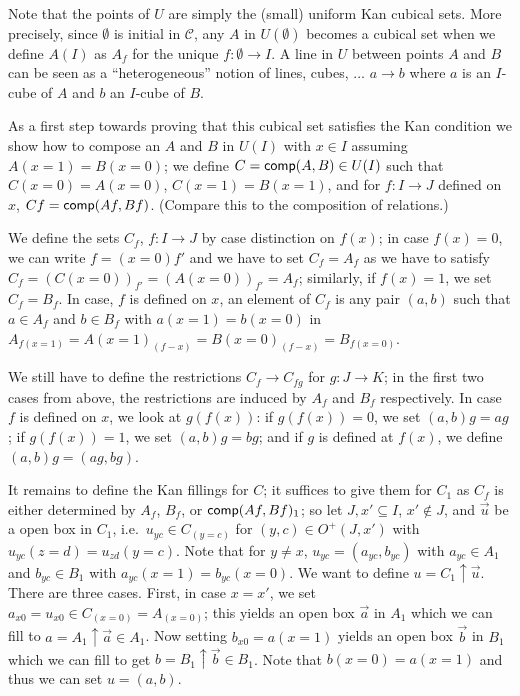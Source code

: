 \documentclass[a4paper,USenglish,draft]{lipics}
\newcommand{\CC}{{\mathcal C}}
\newcommand{\comp}{{\sf comp}}
\newcommand{\es}{\emptyset}
\newcommand{\rup}[1]{#1{\uparrow}}
\newcommand{\OO}{O}
\begin{document}
Note that the points of $U$ are simply the (small) uniform Kan cubical
sets. More precisely, since $\es$ is initial in $\CC$, any $A$ in
$U(\es)$ becomes a cubical set when we define $A(I)$ as $A_f$ for the
unique $f:\es\to I$.  A line in $U$ between points $A$ and $B$ can be
seen as a ``heterogeneous'' notion of lines, cubes, $\dots$ $a\to b$
where $a$ is an $I$-cube of $A$ and $b$ an $I$-cube of $B$.

As a first step towards proving that this cubical set satisfies the
Kan condition we show how to compose an $A$ and $B$ in $U(I)$ with $x
\in I$ assuming $A (x=1) = B(x=0)$; we define $C = \comp(A,B) \in U
(I)$ such that $C (x=0) = A (x=0)$, $C(x=1) = B(x=1)$, and for $f
\colon I \to J$ defined on $x$, $C f = \comp (Af, Bf)$.  (Compare this
to the composition of relations.)

We define the sets $C_f$, $f \colon I \to J$ by case distinction on $f
(x)$; in case $f (x) = 0$, we can write $f = (x=0) f'$ and we have to
set $C_f = A_f$ as we have to satisfy $C_f = (C(x=0))_{f'} = (A
(x=0))_{f'} = A_f$; similarly, if $f (x) = 1$, we set $C_f = B_f$.  In
case, $f$ is defined on $x$, an element of $C_f$ is any pair $(a,b)$
such that $a \in A_f$ and $b \in B_f$ with $a (x=1) = b (x=0)$ in
$A_{f (x=1)} = {A(x=1)}_{(f - x)} = {B(x=0)}_{(f - x)} = B_{f (x=0)}$.

We still have to define the restrictions $C_f \to C_{fg}$ for $g
\colon J \to K$; in the first two cases from above, the restrictions
are induced by $A_f$ and $B_f$ respectively.  In case $f$ is defined
on $x$, we look at $g(f (x))$: if $g (f (x))= 0$, we set $(a,b) g =
ag$; if $g (f (x)) = 1$, we set $(a,b)g = bg$; and if $g$ is defined
at $f (x)$, we define $(a,b)g = (ag,bg)$.

It remains to define the Kan fillings for $C$; it suffices to give
them for $C_1$ as $C_f$ is either determined by $A_f$, $B_f$, or
$\comp (Af,Bf)_1$; so let $J, x' \subseteq I$, $x' \notin J$, and
$\vec u$ be a open box in $C_1$, i.e.\ $u_{yc} \in C_{(y=c)}$ for
$(y,c) \in \OO^+ (J,x')$ with $u_{yc} (z=d) = u_{zd} (y=c)$.  Note
that for $y \neq x$, $u_{yc}= (a_{yc}, b_{yc})$ with $a_{yc} \in A_1$
and $b_{yc} \in B_1$ with $a_{yc} (x=1) = b_{yc} (x=0)$.  We want to
define $u = \rup{C_1}\vec u$.  There are three cases.  First, in case
$x = x'$, we set $a_{x0} = u_{x0} \in C_{(x=0)} = A_{(x=0)}$; this
yields an open box $\vec a$ in $A_1$ which we can fill to $a =
\rup{A_1} \vec a \in A_1$.  Now setting $b_{x0} = a (x=1)$ yields an
open box $\vec b$ in $B_1$ which we can fill to get $b = \rup{B_1}
\vec b \in B_1$. Note that $b(x=0) = a (x=1)$ and thus we can set $u =
(a, b)$.
\end{document}
